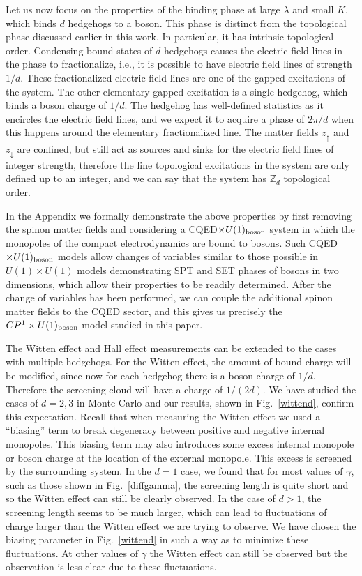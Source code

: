 Let us now focus on the properties of the binding phase at large $\lambda$ and small $K$, which binds $d$ hedgehogs to a boson. This phase is distinct from the topological phase discussed earlier in this work. In particular, it has intrinsic topological order. Condensing bound states of $d$ hedgehogs causes the electric field lines in the phase to fractionalize, i.e., it is possible to have electric field lines of strength $1/d$. These fractionalized electric field lines are one of the gapped excitations of the system. The other elementary gapped excitation is a single hedgehog, which binds a boson charge of $1/d$. The hedgehog has well-defined statistics as it encircles the electric field lines, and we expect it to acquire a phase of $2\pi/d$ when this happens around the elementary fractionalized line. The matter fields $z_\uparrow$ and $z_\downarrow$ are confined, but still act as sources and sinks for the electric field lines of integer strength, therefore the line topological excitations in the system are only defined up to an integer, and we can say that the system has $\mathbb{Z}_d$ topological order.\cite{GukovKapustin,FracFaraday} 

In the Appendix we formally demonstrate the above properties by first removing the spinon matter fields and considering a CQED$\times U(1)_{\rm boson}$ system in which the monopoles of the compact electrodynamics are bound to bosons. Such CQED$\times U(1)_{\rm boson}$ models allow changes of variables similar to those possible in $U(1)\times U(1)$ models demonstrating SPT and SET phases of bosons in two dimensions\cite{FQHE}, which allow their properties to be readily determined. After the change of variables has been performed, we can couple the additional spinon matter fields to the CQED sector, and this gives us precisely the $CP^1\times U(1)_{\rm boson}$ model studied in this paper.

The Witten effect and Hall effect measurements can be extended to the cases with multiple hedgehogs. For the Witten effect, the amount of bound charge will be modified, since now for each hedgehog there is a boson charge of $1/d$. Therefore the screening cloud will have a charge of $1/(2d)$. We have studied the cases of $d=2, 3$ in Monte Carlo and our results, shown in Fig.~\ref{wittend}, confirm this expectation. Recall that when measuring the Witten effect we used a ``biasing'' term to break degeneracy between positive and negative internal monopoles. This biasing term may also introduces some excess internal monopole or boson charge at the location of the external monopole. This excess is screened by the surrounding system. In the $d=1$ case, we found that for most values of $\gamma$, such as those shown in Fig.~\ref{diffgamma}, the screening length is quite short and so the Witten effect can still be clearly observed. In the case of $d>1$, the screening length seems to be much larger, which can lead to fluctuations of charge larger than the Witten effect we are trying to observe. We have chosen the biasing parameter in Fig.~\ref{wittend} in such a way as to minimize these fluctuations. At other values of $\gamma$ the Witten effect can still be observed but the observation is less clear due to these fluctuations.

